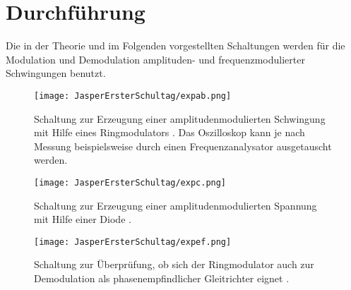  \section{Durchführung}
\label{sec:Durchführung}

Die in der Theorie und im Folgenden vorgestellten Schaltungen werden für die Modulation und
Demodulation amplituden- und frequenzmodulierter Schwingungen benutzt.

\begin{figure}[H]
  \centering
  \texttt{[image: JasperErsterSchultag/expab.png]}
  \caption{Schaltung zur Erzeugung einer amplitudenmodulierten Schwingung mit Hilfe eines Ringmodulators \cite{anleitung}.
  Das Oszilloskop kann je nach Messung beispielsweise durch einen Frequenzanalysator ausgetauscht werden.}
  \label{fig:expab}
\end{figure}

\begin{figure}[H]
  \centering
  \texttt{[image: JasperErsterSchultag/expc.png]}
  \caption{Schaltung zur Erzeugung einer amplitudenmodulierten Spannung mit Hilfe einer Diode \cite{anleitung}.}
  \label{fig:expc}
\end{figure}

\begin{figure}[H]
  \centering
  \texttt{[image: JasperErsterSchultag/expef.png]}
  \caption{Schaltung zur Überprüfung, ob sich der Ringmodulator auch zur Demodulation als
  phasenempfindlicher Gleitrichter eignet \cite{anleitung}.}
  \label{fig:expef}
\end{figure}

